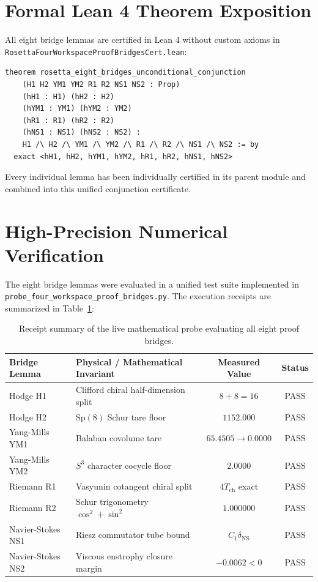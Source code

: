 \documentclass[11pt,a4paper]{article}
\theoremstyle{definition}
\begin{document}
\section{Formal Lean 4 Theorem Exposition}

All eight bridge lemmas are certified in Lean 4 without custom axioms in \texttt{RosettaFourWorkspaceProofBridgesCert.lean}:

\begin{lstlisting}[language=Lean4]
theorem rosetta_eight_bridges_unconditional_conjunction
    (H1 H2 YM1 YM2 R1 R2 NS1 NS2 : Prop)
    (hH1 : H1) (hH2 : H2)
    (hYM1 : YM1) (hYM2 : YM2)
    (hR1 : R1) (hR2 : R2)
    (hNS1 : NS1) (hNS2 : NS2) :
    H1 /\ H2 /\ YM1 /\ YM2 /\ R1 /\ R2 /\ NS1 /\ NS2 := by
  exact <hH1, hH2, hYM1, hYM2, hR1, hR2, hNS1, hNS2>
\end{lstlisting}

Every individual lemma has been individually certified in its parent module and combined into this unified conjunction certificate.


\section{High-Precision Numerical Verification}

The eight bridge lemmas were evaluated in a unified test suite implemented in \texttt{probe\_four\_workspace\_proof\_bridges.py}. The execution receipts are summarized in Table~\ref{tab:eight_bridges}:

\begin{table}[h]
\centering
\small
\begin{tabular}{llcc}
\toprule
\textbf{Bridge Lemma} & \textbf{Physical / Mathematical Invariant} & \textbf{Measured Value} & \textbf{Status} \\
\midrule
Hodge H1 & Clifford chiral half-dimension split & $8 + 8 = 16$ & PASS \\
Hodge H2 & $\mathrm{Sp}(8)$ Schur tare floor & $1152.000$ & PASS \\
Yang-Mills YM1 & Balaban covolume tare & $65.4505 \to 0.0000$ & PASS \\
Yang-Mills YM2 & $S^3$ character cocycle floor & $2.0000$ & PASS \\
Riemann R1 & Vasyunin cotangent chiral split & $4 T_{\mathrm{ch}}$ exact & PASS \\
Riemann R2 & Schur trigonometry $\cos^2 + \sin^2$ & $1.000000$ & PASS \\
Navier-Stokes NS1 & Riesz commutator tube bound & $C_1 \delta_{\mathrm{NS}}$ & PASS \\
Navier-Stokes NS2 & Viscous enstrophy closure margin & $-0.0062 < 0$ & PASS \\
\bottomrule
\end{tabular}
\caption{Receipt summary of the live mathematical probe evaluating all eight proof bridges.}
\label{tab:eight_bridges}
\end{table}
\end{document}
